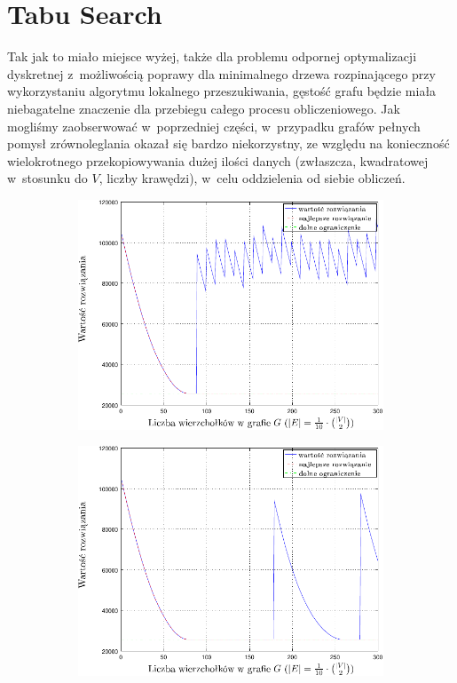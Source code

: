 \section{Tabu Search}

Tak jak to miało miejsce wyżej, także dla problemu odpornej optymalizacji dyskretnej z~możliwością poprawy dla minimalnego drzewa rozpinającego przy wykorzystaniu algorytmu lokalnego przeszukiwania, gęstość grafu będzie miała niebagatelne znaczenie dla przebiegu całego procesu obliczeniowego. Jak mogliśmy zaobserwować w~poprzedniej części, w~przypadku grafów pełnych pomysł zrównoleglania okazał się bardzo niekorzystny, ze względu na konieczność wielokrotnego przekopiowywania dużej ilości danych (zwłaszcza, kwadratowej w~stosunku do $V$, liczby krawędzi), w~celu oddzielenia od siebie obliczeń.

\begin{figure}[!htbp]
	\renewcommand\figurename{Wykres}
	\null\hfill
	\begin{subfigure}[b]{0.45\textwidth}
		\includegraphics[width=\textwidth]{Chapter_VI/RRIMST1-example/RRIMST1_psfrag}
		\caption{}
		\label{fig:rrimst1:a}
	\end{subfigure}
	\hfill
	\begin{subfigure}[b]{0.45\textwidth}
		\includegraphics[width=\textwidth]{Chapter_VI/RRIMST2-example/RRIMST2_psfrag}

\end{subfigure}
\end{figure}
